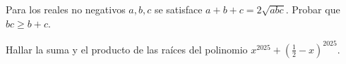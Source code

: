 \begin{exercise}
    Para los reales no negativos $a,b,c$ se satisface $a + b + c = 2 \sqrt {abc}$.
    Probar que $bc \geq b + c$.
\end{exercise}

\begin{exercise}
    Hallar la suma y el producto de las raíces del polinomio $x^{2025} + \left(\frac{1}{2} - x\right)^{2025}$.
\end{exercise}

\begin{problem-wos}
\end{problem-wos}